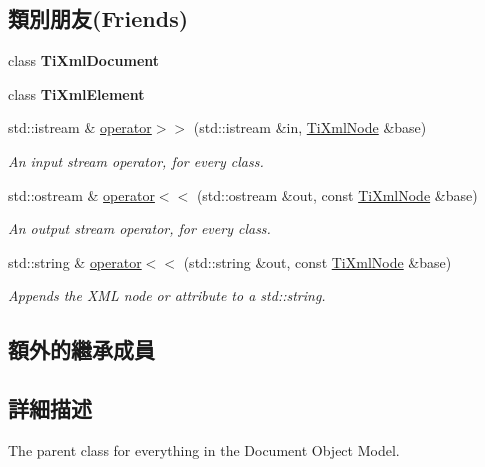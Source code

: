 \subsection*{類別朋友(Friends)}
\begin{DoxyCompactItemize}
\item 
class {\bfseries Ti\+Xml\+Document}\hypertarget{class_ti_xml_node_a173617f6dfe902cf484ce5552b950475}{}\label{class_ti_xml_node_a173617f6dfe902cf484ce5552b950475}

\item 
class {\bfseries Ti\+Xml\+Element}\hypertarget{class_ti_xml_node_ab6592e32cb9132be517cc12a70564c4b}{}\label{class_ti_xml_node_ab6592e32cb9132be517cc12a70564c4b}

\item 
std\+::istream \& \hyperlink{class_ti_xml_node_ab57bd426563c926844f65a78412e18b9}{operator$>$$>$} (std\+::istream \&in, \hyperlink{class_ti_xml_node}{Ti\+Xml\+Node} \&base)
\begin{DoxyCompactList}\small\item\em An input stream operator, for every class. \end{DoxyCompactList}\item 
std\+::ostream \& \hyperlink{class_ti_xml_node_a86cd49cfb17a844c0010b3136ac966c7}{operator$<$$<$} (std\+::ostream \&out, const \hyperlink{class_ti_xml_node}{Ti\+Xml\+Node} \&base)
\begin{DoxyCompactList}\small\item\em An output stream operator, for every class. \end{DoxyCompactList}\item 
std\+::string \& \hyperlink{class_ti_xml_node_a52ef17e7080df2490cf87bde380685ab}{operator$<$$<$} (std\+::string \&out, const \hyperlink{class_ti_xml_node}{Ti\+Xml\+Node} \&base)\hypertarget{class_ti_xml_node_a52ef17e7080df2490cf87bde380685ab}{}\label{class_ti_xml_node_a52ef17e7080df2490cf87bde380685ab}

\begin{DoxyCompactList}\small\item\em Appends the X\+ML node or attribute to a std\+::string. \end{DoxyCompactList}\end{DoxyCompactItemize}
\subsection*{額外的繼承成員}


\subsection{詳細描述}
The parent class for everything in the Document Object Model. 

